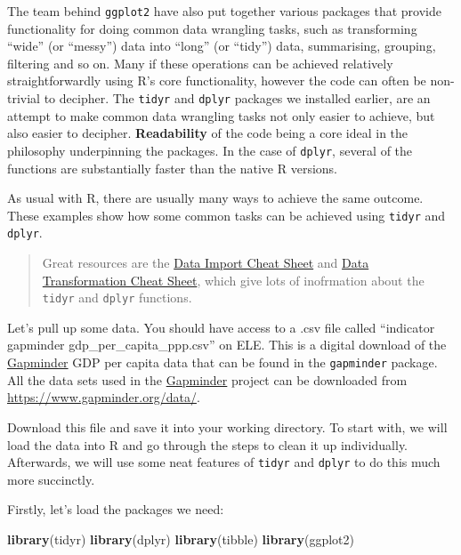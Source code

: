 \documentclass[]{book}
\newenvironment{Shaded}{\begin{snugshade}}{\end{snugshade}}
\newcommand{\KeywordTok}[1]{\textcolor[rgb]{0.13,0.29,0.53}{\textbf{{#1}}}}
\newcommand{\NormalTok}[1]{{#1}}
\theoremstyle{definition}
\theoremstyle{definition}
\theoremstyle{definition}
\theoremstyle{remark}
\begin{document}
The team behind \texttt{ggplot2} have also put together various packages
that provide functionality for doing common data wrangling tasks, such
as transforming ``wide'' (or ``messy'') data into ``long'' (or ``tidy'')
data, summarising, grouping, filtering and so on. Many if these
operations can be achieved relatively straightforwardly using R's core
functionality, however the code can often be non-trivial to decipher.
The \texttt{tidyr} and \texttt{dplyr} packages we installed earlier, are
an attempt to make common data wrangling tasks not only easier to
achieve, but also easier to decipher. \textbf{Readability} of the code
being a core ideal in the philosophy underpinning the packages. In the
case of \texttt{dplyr}, several of the functions are substantially
faster than the native R versions.

As usual with R, there are usually many ways to achieve the same
outcome. These examples show how some common tasks can be achieved using
\texttt{tidyr} and \texttt{dplyr}.

\begin{quote}
Great resources are the
\href{https://github.com/rstudio/cheatsheets/raw/master/source/pdfs/data-import-cheatsheet.pdf}{Data
Import Cheat Sheet} and
\href{https://github.com/rstudio/cheatsheets/raw/master/source/pdfs/data-transformation-cheatsheet.pdf}{Data
Transformation Cheat Sheet}, which give lots of inofrmation about the
\texttt{tidyr} and \texttt{dplyr} functions.
\end{quote}

Let's pull up some data. You should have access to a .csv file called
``indicator gapminder gdp\_per\_capita\_ppp.csv'' on ELE. This is a
digital download of the \href{https://www.gapminder.org/}{Gapminder} GDP
per capita data that can be found in the \texttt{gapminder} package. All
the data sets used in the \href{https://www.gapminder.org/}{Gapminder}
project can be downloaded from \url{https://www.gapminder.org/data/}.

Download this file and save it into your working directory. To start
with, we will load the data into R and go through the steps to clean it
up individually. Afterwards, we will use some neat features of
\texttt{tidyr} and \texttt{dplyr} to do this much more succinctly.

Firstly, let's load the packages we need:

\begin{Shaded}
\begin{Highlighting}[]
\KeywordTok{library}\NormalTok{(tidyr)}
\KeywordTok{library}\NormalTok{(dplyr)}
\KeywordTok{library}\NormalTok{(tibble)}
\KeywordTok{library}\NormalTok{(ggplot2)}
\end{Highlighting}
\end{Shaded}
\end{document}
